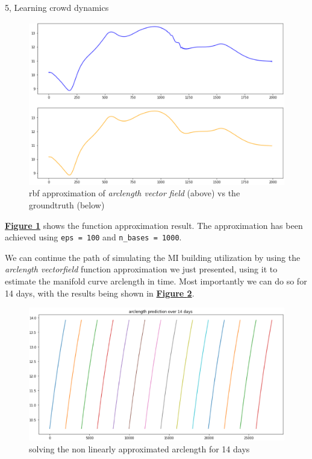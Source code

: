 \documentclass[10pt,a4paper]{article}
\begin{document}
\begin{task}{5, Learning crowd dynamics}
\begin{figure}[H]
    \centering
    \includegraphics[scale=0.6]{images/task5-rbf-vectorfield.png}
    \caption{rbf approximation of \textit{arclength vector field} (above) vs the groundtruth (below)}
    \label{fig:task5-rbf-vectorfield}
\end{figure}
\textbf{\hyperref[fig:task5-rbf-vectorfield]{Figure \ref{fig:task5-rbf-vectorfield}}} shows the function approximation result. The approximation has been achieved using \texttt{eps = 100} and \texttt{n\_bases = 1000}.

We can continue the path of simulating the MI building utilization by using the \textit{arclength vectorfield} function approximation we just presented, using it to estimate the manifold curve arclength in time. Most importantly we can do so for 14 days, with the results being shown in \textbf{\hyperref[fig:task5-rainbow]{Figure \ref{fig:task5-rainbow}}}.

\begin{figure}[H]
    \centering
    \includegraphics[scale=0.55]{images/task5-rainbow.png}
    \caption{solving the non linearly approximated arclength for 14 days}
    \label{fig:task5-rainbow}
\end{figure}


\end{task}
\end{document}
